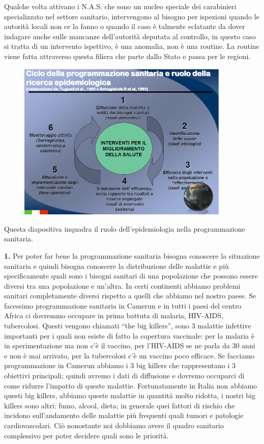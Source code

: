 Qualche volta attivano i N.A.S. che sono un nucleo speciale dei
carabinieri specializzato nel settore sanitario, intervengono al bisogno
per ispezioni quando le autorità locali non ce la fanno o quando il caso
è talmente eclatante da dover indagare anche sulle mancanze
dell'autorità deputata al controllo, in questo caso si tratta di un
intervento ispettivo, è una anomalia, non è una routine. La routine
viene fatta attraverso questa filiera che parte dallo Stato e passa per
le regioni.
\begin{figure}[!ht]
\centering
	\includegraphics[width=0.9\textwidth]{02/image15.png}
\end{figure}


Questa diapositiva inquadra il ruolo dell'epidemiologia nella
programmazione sanitaria.

\textbf{1.} Per poter far bene la programmazione sanitaria bisogna
conoscere la situazione sanitaria e quindi bisogna conoscere la
distribuzione delle malattie e più specificamente quali sono i bisogni
sanitari di una popolazione che possono essere diversi tra una
popolazione e un'altra. In certi continenti abbiamo problemi sanitari
completamente diversi rispetto a quelli che abbiamo nel nostro paese. Se
facessimo programmazione sanitaria in Camerun e in tutti i paesi del
centro Africa ci dovremmo occupare in prima battuta di malaria,
HIV-AIDS, tubercolosi. Questi vengono chiamati ``the big killers'', sono
3 malattie infettive importanti per i quali non esiste di fatto la
copertura vaccinale: per la malaria è in sperimentazione ma non c'è il
vaccino, per l'HIV-AIDS se ne parla da 30 anni e non è mai arrivato, per
la tubercolosi c'è un vaccino poco efficace. Se facciamo programmazione
in Camerun abbiamo i 3 big killers che rappresentano i 3 obiettivi
principali; quindi avremo i dati di diffusione e dovremo occuparci di
come ridurre l'impatto di queste malattie. Fortunatamente in Italia non
abbiamo questi big killers, abbiamo queste malattie in quantità molto
ridotta, i nostri big killers sono altri: fumo, alcool, dieta; in
generale quei fattori di rischio che incidono sull'andamento delle
malattie più frequenti quali tumori e patologie cardiovascolari. Ciò
nonostante noi dobbiamo avere il quadro sanitario complessivo per poter
decidere quali sono le priorità.

